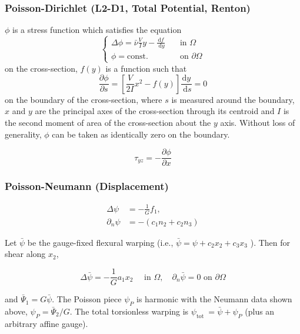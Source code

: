 \subsubsection{Poisson-Dirichlet (L2-D1, Total Potential, Renton)}

$\phi$ is a stress function which satisfies the equation
\begin{equation}
\left\{
\begin{aligned}
\Delta \phi=\bar{\nu} \frac{V}{I}y-\frac{\mathrm{d} f}{\mathrm{~d} y} \quad& \text{in } \Omega\\
\phi = \text{const.} \quad&\text{on }\partial\Omega
\end{aligned}
\right.
\end{equation}
on the cross-section, $f(y)$ is a function such that
$$
\frac{\partial \phi}{\partial s}=\left[\frac{V}{2 I} x^2-f(y)\right] \frac{\mathrm{d} y}{\mathrm{~d} s}=0
$$
on the boundary of the cross-section, where $s$ is measured around the boundary, $x$ and $y$ are the principal axes of the cross-section through its centroid and $I$ is the second moment of area of the cross-section about the $y$ axis. Without loss of generality, $\phi$ can be taken as identically zero on the boundary.

$$
\tau_{y z}=-\frac{\partial \phi}{\partial x}
$$


\subsubsection{Poisson-Neumann (Displacement)}
\begin{equation}
\begin{aligned}
\Delta \psi&=-\frac{1}{G} f_1, \\
\partial_n \psi&=-\left(c_1 n_2+c_2 n_3\right)
\end{aligned}
\end{equation}



Let $\bar{\psi}$ be the gauge-fixed flexural warping (i.e., $\bar{\psi}=\psi+c_2 x_2+c_3 x_3$ ). Then for shear along $x_2$,

$$
\Delta \bar{\psi}=-\frac{1}{G} a_1 x_2 \quad \text { in } \Omega, \quad \partial_n \bar{\psi}=0 \text { on } \partial \Omega
$$

and $\bar{\Psi}_1=G \bar{\psi}$. The Poisson piece $\psi_P$ is harmonic with the Neumann data shown above, $\psi_P=\bar{\Psi}_2 / G$. The total torsionless warping is $\psi_{\text {tot }}=\bar{\psi}+\psi_P$ (plus an arbitrary affine gauge).
